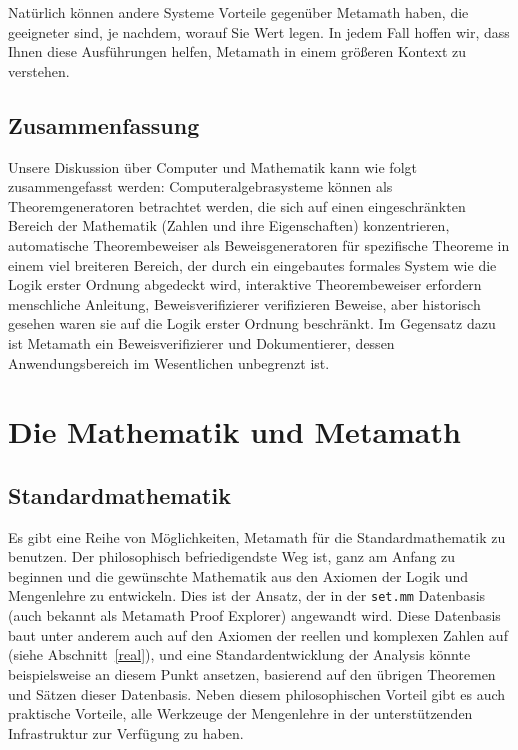 Natürlich können andere Systeme Vorteile gegenüber Metamath haben, die geeigneter sind, je nachdem, worauf Sie Wert legen.
In jedem Fall hoffen wir, dass Ihnen diese Ausführungen helfen, Metamath in einem größeren Kontext zu verstehen.

\subsection{Zusammenfassung}\label{computers-summary}

Unsere Diskussion über Computer und Mathematik kann wie folgt zusammengefasst werden: Computeralgebrasysteme können als Theoremgeneratoren betrachtet werden, die sich auf einen eingeschränkten Bereich der Mathematik (Zahlen und ihre Eigenschaften) konzentrieren, automatische Theorembeweiser als Beweisgeneratoren für spezifische Theoreme in einem viel breiteren Bereich, der durch ein eingebautes formales System wie die Logik erster Ordnung abgedeckt wird, interaktive Theorembeweiser erfordern menschliche Anleitung, Beweisverifizierer verifizieren Beweise, aber historisch gesehen waren sie auf die Logik erster Ordnung beschränkt.
Im Gegensatz dazu ist Metamath ein Beweisverifizierer und Dokumentierer, dessen Anwendungsbereich im Wesentlichen unbegrenzt ist.

\section{Die Mathematik und Metamath}

\subsection{Standardmathematik}

Es gibt eine Reihe von Möglichkeiten, Metamath für die Standardmathematik zu benutzen.  Der philosophisch befriedigendste Weg ist, ganz am Anfang zu beginnen und die gewünschte Mathematik aus den Axiomen der Logik und Mengenlehre zu entwickeln.  Dies ist der Ansatz, der in der
\texttt{set.mm}%
Datenbasis (auch bekannt als Metamath Proof Explorer) angewandt wird.
Diese Datenbasis baut unter anderem auch auf den Axiomen der reellen und komplexen Zahlen auf (siehe Abschnitt~\ref{real}), und eine Standardentwicklung der Analysis könnte beispielsweise an diesem Punkt ansetzen, basierend auf den übrigen Theoremen und Sätzen dieser Datenbasis.
Neben diesem philosophischen Vorteil gibt es auch praktische Vorteile, alle Werkzeuge der Mengenlehre in der unterstützenden Infrastruktur zur Verfügung zu haben.

